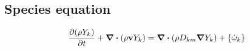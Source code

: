 
\subsection{Species equation}

\begin{equation}
	\pdv{(\rho Y_k)}{t} + \div(\rho \vb{v} Y_k) = 
	\div(\rho D_{km} \grad{Y_k}) + \left\{ \dot{\omega}_k \right\}
\end{equation}

